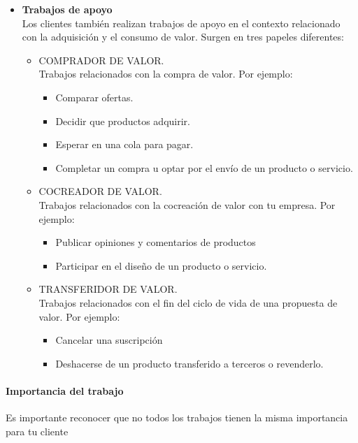 \documentclass[11pt]{book}
\begin{document}
\begin{itemize}
\item \textbf{Trabajos de apoyo}\\
Los clientes también realizan trabajos de apoyo en el contexto relacionado con la adquisición y el consumo de valor. Surgen en tres papeles diferentes:
\begin{itemize}
\item COMPRADOR DE VALOR.\\
Trabajos relacionados con la compra de valor. Por ejemplo:
\begin{itemize}
\item Comparar ofertas.
\item Decidir que productos adquirir.
\item Esperar en una cola para pagar.
\item Completar un compra u optar por el envío de un producto o servicio.
\end{itemize}
\item COCREADOR DE VALOR.\\
Trabajos relacionados con la cocreación de valor con tu empresa. Por ejemplo:
\begin{itemize}
\item Publicar opiniones y comentarios de productos
\item Participar en el diseño de un producto o servicio.
\end{itemize}

\item TRANSFERIDOR DE VALOR.\\
Trabajos relacionados con el fin del ciclo de vida de una propuesta de valor. Por ejemplo:
\begin{itemize}
\item Cancelar una suscripción
\item Deshacerse de un producto transferido a terceros o revenderlo.
\end{itemize}
\end{itemize}
\end{itemize}
\paragraph{Importancia del trabajo}
Es importante reconocer que no todos los trabajos tienen la misma importancia para tu cliente
\end{document}
